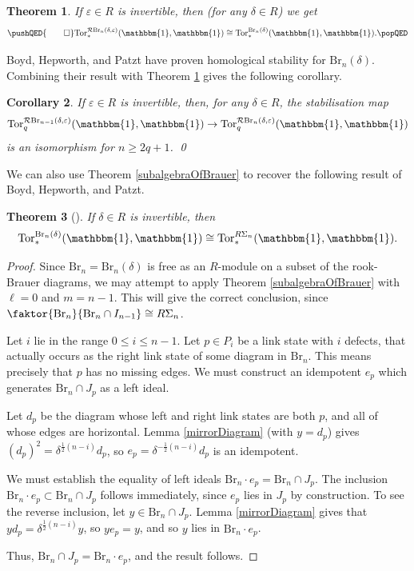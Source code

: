 \documentclass[12pt]{amsart}
\theoremstyle{plain}
\newtheorem{theorem}{Theorem}[section]
\theoremstyle{definition} \newtheorem{definition}[theorem]{Definition}
\theoremstyle{plain}
\theoremstyle{plain} \newtheorem{proposition}[theorem]{Proposition}
\theoremstyle{plain} \newtheorem{conjecture}[theorem]{Conjecture}
\theoremstyle{plain} \newtheorem{corollary}[theorem]{Corollary}
\theoremstyle{remark} \newtheorem{claim}[theorem]{Claim}
\theoremstyle{remark} \newtheorem{remark}[theorem]{Remark}
\theoremstyle{remark} \newtheorem{example}[theorem]{Example}
\theoremstyle{remark} \newtheorem{comment}[theorem]{Comment}
\theoremstyle{definition} \newtheorem{question}[theorem]{Question}
\renewcommand{\t}{\mathbbm{1}}
\newcommand{\RB}{\mathcal{R}\mathrm{Br}}
\newcommand{\Tor}{\mathrm{Tor}}
\newcommand{\Brauer}{\mathrm{Br}}
\begin{document}
\begin{theorem} \label{rookBrauerInvertible} If $\varepsilon \in R$ is invertible, then (for any $\delta \in R$) we get \[\pushQED{\qed} 
\Tor_*^{\RB_n(\delta, \varepsilon)}(\t,\t) \cong \Tor_*^{\Brauer_n(\delta)}(\t,\t).\qedhere
\popQED
\] \end{theorem}

Boyd, Hepworth, and Patzt \cite{BHP} have proven homological stability for $\Brauer_n(\delta)$. Combining their result with Theorem \ref{rookBrauerInvertible} gives the following corollary.

\begin{corollary} \label{funOne} If $\varepsilon \in R$ is invertible, then, for any $\delta \in R$, the stabilisation map 
$$\Tor_q^{\RB_{n-1}(\delta, \varepsilon)}(\t,\t) \to \Tor_q^{\RB_{n}(\delta, \varepsilon)}(\t,\t)$$ is an isomorphism for $n \geq 2q+1$. \qed \end{corollary}

We can also use Theorem \ref{subalgebraOfBrauer} to recover the following result of Boyd, Hepworth, and Patzt.

\begin{theorem}[\cite{BHP}] \label{BrauerRecovery} If $\delta \in R$ is invertible, then
$$ \Tor_*^{\Brauer_n(\delta)}(\t,\t) \cong \Tor_*^{R \Sigma_n}(\t,\t).$$ \end{theorem}

\begin{proof} Since $\Brauer_n = \Brauer_n(\delta)$ is free as an $R$-module on a subset of the rook-Brauer diagrams, we may attempt to apply Theorem \ref{subalgebraOfBrauer} with $\ell =0$ and $m = n-1$. This will give the correct conclusion, since $\faktor{\Brauer_n}{\Brauer_n \cap I_{n-1}} \cong R \Sigma_n$.

Let $i$ lie in the range $0 \leq i \leq n-1$. Let $p \in P_i$ be a link state with $i$ defects, that actually occurs as the right link state of some diagram in $\Brauer_n$. This means precisely that $p$ has no missing edges. We must construct an idempotent $e_p $ which generates $\Brauer_n \cap J_p$ as a left ideal.

Let $d_p$ be the diagram whose left and right link states are both $p$, and all of whose edges are horizontal. Lemma \ref{mirrorDiagram} (with $y=d_p$) gives $(d_p)^2 = \delta^{\frac{1}{2}(n-i)} d_p$, so $e_p = \delta^{-\frac{1}{2}(n-i)} d_p$ is an idempotent.

We must establish the equality of left ideals $\Brauer_n \cdot e_p = \Brauer_n \cap J_p$. The inclusion $\Brauer_n \cdot e_p  \subset \Brauer_n \cap J_p$ follows immediately, since $e_p$ lies in $J_p$ by construction. To see the reverse inclusion, let $y \in \Brauer_n \cap J_p$. Lemma \ref{mirrorDiagram} gives that $y d_p = \delta^{\frac{1}{2}(n-i)} y$, so $y e_p = y$, and so $y$ lies in $\Brauer_n  \cdot e_p$.

Thus, $\Brauer_n \cap J_p = \Brauer_n \cdot e_p$, and the result follows. \end{proof}
\end{document}
